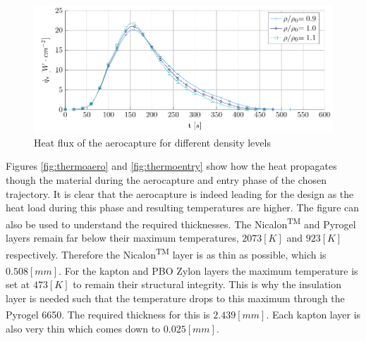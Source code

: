 \begin{figure}[h]
	\centering
	\includegraphics{./Figure/Thermal/heatfluxes.pdf}
	\caption{Heat flux of the aerocapture for different density levels}
	\label{fig:heatfluxes}
\end{figure}

Figures \ref{fig:thermoaero} and \ref{fig:thermoentry} show how the heat propagates though the material during the aerocapture and entry phase of the chosen trajectory. It is clear that the aerocapture is indeed leading for the design as the heat load during this phase and resulting temperatures are higher. The figure can also be used to understand the required thicknesses. The Nicalon\textsuperscript{TM} and Pyrogel\textsuperscript{\textregistered} layers remain far below their maximum temperatures, $2073 \left[K\right]$ and $923 \left[K\right]$ respectively. Therefore the Nicalon\textsuperscript{TM} layer is as thin as possible, which is $0.508 \left[mm\right]$. For the kapton and PBO Zylon\textsuperscript{\textregistered} layers the maximum temperature is set at $473 \left[K\right]$ to remain their structural integrity. This is why the insulation layer is needed such that the temperature drops to this maximum through the Pyrogel\textsuperscript{\textregistered} 6650. The required thickness for this is $2.439 \left[mm\right]$. Each kapton layer is also very thin which comes down to $0.025 \left[mm\right]$.

